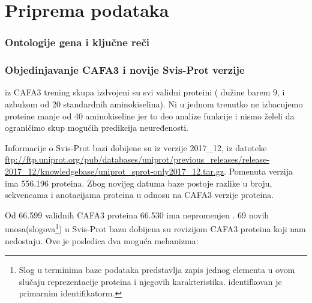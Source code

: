 
\chapter{Priprema podataka} %

\label{Priprema_podataka} %





\subsection{Ontologije gena i ključne reči}



\subsection{Objedinjavanje CAFA3 i novije Svis-Prot verzije}

iz CAFA3 trening skupa izdvojeni su svi validni proteini ( dužine barem 9, i
azbukom od 20 standardnih aminokiselina). Ni u jednom trenutko ne izbacujemo
proteine manje od 40 aminokiseline jer to deo analize funkcije i nismo želeli
da ograničimo skup mogućih predikcija neuređenosti.

Informacije o Svis-Prot bazi dobijene su iz verzije 2017\_12, iz datoteke
\url{ftp://ftp.uniprot.org/pub/databases/uniprot/previous_releases/release-2017_12/knowledgebase/uniprot_sprot-only2017_12.tar.gz}.
Pomenuta verzija ima 556.196 proteina. Zbog novijeg datuma baze postoje razlike
u broju, sekvencama i  anotacijama proteina u odnosu na CAFA3 verzije proteina.

Od 66.599 validnih CAFA3 proteina 66.530 ima nepromenjen  .  69 novih unosa(slogova\footnote{ Slog
   u terminima baze podataka predstavlja zapis jednog elementa u
ovom slučaju reprezentacije proteina i njegovih karakteristika.  identifkovan
je primarnim identifikatorm.  }) u Svis-Prot bazu dobijena su revizijom CAFA3
proteina koji nam nedostaju.  Ove je posledica dva moguća mehanizma:

